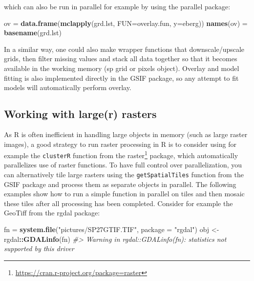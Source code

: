 \documentclass[graybox,natbib,nospthms,UStrade]{svmono}
\newenvironment{Shaded}{\begin{snugshade}}{\end{snugshade}}
\newcommand{\CommentTok}[1]{\textcolor[rgb]{0.37,0.37,0.37}{\textit{#1}}}
\newcommand{\DataTypeTok}[1]{\textcolor[rgb]{0.27,0.27,0.27}{#1}}
\newcommand{\KeywordTok}[1]{\textcolor[rgb]{0.27,0.27,0.27}{\textbf{#1}}}
\newcommand{\NormalTok}[1]{#1}
\newcommand{\OperatorTok}[1]{\textcolor[rgb]{0.43,0.43,0.43}{\textbf{#1}}}
\newcommand{\StringTok}[1]{\textcolor[rgb]{0.5,0.5,0.5}{#1}}
\renewcommand{\href}[2]{#2 (\url{#1})}
\renewcommand{\href}[2]{#2\footnote{\url{#1}}}
\begin{document}
which can also be run in parallel for example by using the parallel package:

\begin{Shaded}
\begin{Highlighting}[]
\NormalTok{ov =}\StringTok{ }\KeywordTok{data.frame}\NormalTok{(}\KeywordTok{mclapply}\NormalTok{(grd.lst, }\DataTypeTok{FUN=}\NormalTok{overlay.fun, }\DataTypeTok{y=}\NormalTok{eberg))}
\KeywordTok{names}\NormalTok{(ov) =}\StringTok{ }\KeywordTok{basename}\NormalTok{(grd.lst)}
\end{Highlighting}
\end{Shaded}

In a similar way, one could also make wrapper functions that downscale/upscale grids, then filter missing values and stack all data together so that it becomes available in the working memory (sp grid or pixels object). Overlay and model fitting is also implemented directly in the GSIF package, so any attempt to fit models will automatically perform overlay.

\hypertarget{working-with-larger-rasters}{%
\subsection{Working with large(r) rasters}\label{working-with-larger-rasters}}

As R is often inefficient in handling large objects in memory (such as large raster images), a good strategy to run raster processing in R is to consider using for example the \texttt{clusterR} function from the \href{https://cran.r-project.org/package=raster}{raster} package, which automatically parallelizes use of raster functions. To have full control over parallelization, you can alternatively tile large rasters using the \texttt{getSpatialTiles} function from the GSIF package and process them as separate objects in parallel. The following examples show how to run a simple function in parallel on tiles and then mosaic these tiles after all processing has been completed. Consider for example the GeoTiff from the rgdal package:

\begin{Shaded}
\begin{Highlighting}[]
\NormalTok{fn =}\StringTok{ }\KeywordTok{system.file}\NormalTok{(}\StringTok{"pictures/SP27GTIF.TIF"}\NormalTok{, }\DataTypeTok{package =} \StringTok{"rgdal"}\NormalTok{)}
\NormalTok{obj <-}\StringTok{ }\NormalTok{rgdal}\OperatorTok{::}\KeywordTok{GDALinfo}\NormalTok{(fn)}
\CommentTok{#> Warning in rgdal::GDALinfo(fn): statistics not supported by this driver}
\end{Highlighting}
\end{Shaded}
\end{document}
